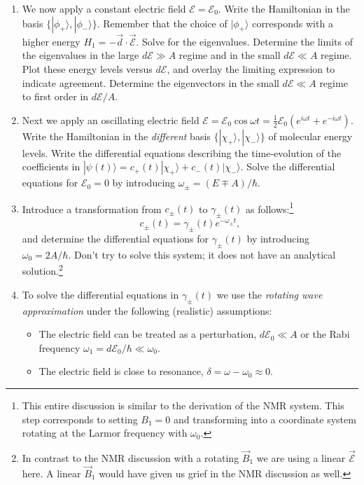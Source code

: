 \documentclass[letterpaper,11pt]{article}
\begin{document}
\begin{enumerate}
\begin{enumerate}
    \item We now apply a constant electric field $\mathcal{E} = \mathcal{E}_0$. Write the Hamiltonian in the basis $\{|\phi_+\rangle, |\phi_-\rangle\}$. Remember that the choice of $|\phi_+\rangle$ corresponds with a higher energy $H_1 = -\vec{d} \cdot \vec{\mathcal{E}}$. Solve for the eigenvalues. Determine the limits of the eigenvalues in the large $d\mathcal{E} \gg A$ regime and in the small $d\mathcal{E} \ll A$ regime. Plot these energy levels versus $d\mathcal{E}$, and overlay the limiting expression to indicate agreement. Determine the eigenvectors in the small $d\mathcal{E} \ll A$ regime to first order in $d\mathcal{E} / A$.
    \item Next we apply an oscillating electric field $\mathcal{E} = \mathcal{E}_0 \cos \omega t = \frac{1}{2} \mathcal{E}_0 (e^{i\omega t} + e^{-i\omega t})$. Write the Hamiltonian in the \emph{different} basis $\{|\chi_+\rangle, |\chi_-\rangle\}$ of molecular energy levels. Write the differential equations describing the time-evolution of the coefficients in $|\psi(t)\rangle = c_+(t) |\chi_+\rangle + c_-(t) |\chi_-\rangle$. Solve the differential equations for $\mathcal{E}_0 = 0$ by introducing $\omega_\pm = (E \mp A)/\hbar$.
    \item Introduce a transformation from $c_\pm(t)$ to $\gamma_\pm(t)$ as follows:\footnote{This entire discussion is similar to the derivation of the NMR system. This step corresponds to setting $B_1 = 0$ and transforming into a coordinate system rotating at the Larmor frequency with $\omega_0$.}
    $$ c_\pm(t) = \gamma_\pm(t) e^{-\omega_\pm t}, $$
    and determine the differential equations for $\gamma_\pm(t)$ by introducing $\omega_0 = 2 A/\hbar$. Don't try to solve this system; it does not have an analytical solution.\footnote{In contrast to the NMR discussion with a rotating $\vec{B}_1$ we are using a linear $\vec{\mathcal{E}}$ here. A linear $\vec{B}_1$ would have given us grief in the NMR discussion as well.}
    \item To solve the differential equations in $\gamma_\pm(t)$ we use the \emph{rotating wave approximation} under the following (realistic) assumptions:
    \begin{itemize}
      \item The electric field can be treated as a perturbation, $d \mathcal{E}_0 \ll A$ or the Rabi frequency $\omega_1 = d \mathcal{E}_0/\hbar \ll \omega_0$.
      \item The electric field is close to resonance, $\delta = \omega - \omega_0 \approx 0$.

\end{itemize}
\end{enumerate}
\end{enumerate}
\end{document}
